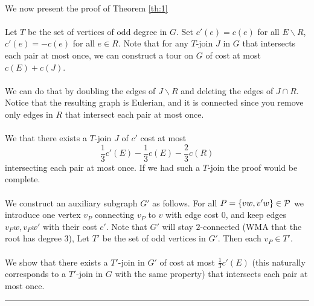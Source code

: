 \documentclass[letterpaper,12pt,oneside,onecolumn]{article}
\newenvironment{proof}{{\bf Proof:  }}{\hfill\rule{2mm}{2mm}}
\begin{document}
\paragraph{}
We now present the proof of Theorem \ref{th:1}
\paragraph{}
\begin{proof}
Let $T$ be the set of vertices of odd degree in $G$. Set $c'(e) = c(e)$ for all $E\backslash R$, $c'(e) = -c(e)$ for all $e \in R$. Note that for any $T$-join $J$ in $G$ that intersects each pair at most once, we can construct a tour on $G$ of cost at most $c(E) + c(J)$.
\paragraph{}
We can do that by doubling the edges of $J\backslash R$ and deleting the edges of $J\cap R$. Notice that the resulting graph is Eulerian, and it is connected since you remove only edges in $R$ that intersect each pair at most once.
\paragraph{}
We that there exists a $T$-join $J$ of $c'$ cost at most 
$$\frac{1}{3} c'(E) - \frac{1}{3}c(E) - \frac{2}{3}c(R)$$
intersecting each pair at most once. If we had such a $T$-join the proof would be complete.
\paragraph{}
We construct an auxiliary subgraph $G'$ as follows. For all $P=\{vw,v'w\} \in \mathcal{P}$ we introduce one vertex $v_P$ connecting $v_P$ to $v$ with edge cost $0$, and keep edges $v_Pw, v_Pw'$ with their cost $c'$. Note that $G'$ will stay $2$-connected (WMA that the root has degree $3$), Let $T'$ be the set of odd vertices in $G'$. Then each $v_P \in T'$.
\paragraph{}
We show that there exists a $T'$-join in $G'$ of cost at most $\frac{1}{3}c'(E)$ (this naturally corresponds to a $T'$-join in $G$ with the same property) that intersects each pair at most once.

\end{proof}
\end{document}
